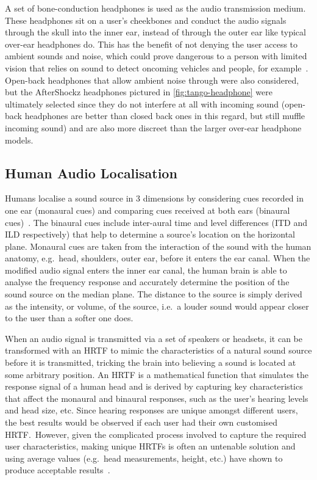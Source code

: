 \documentclass{llncs}
\begin{document}
A set of bone-conduction headphones is used as the audio transmission medium.
These headphones sit on a user's cheekbones and conduct the audio signals through the skull into the inner ear, instead of through the outer ear like typical over-ear headphones do. 
This has the benefit of not denying the user access to ambient sounds and noise, which could prove dangerous to a person with limited vision that relies on sound to detect oncoming vehicles and people, for example~\cite{lichtenstein2012headphone}.
Open-back headphones that allow ambient noise through were also considered, but the AfterShockz headphones pictured in \cref{fig:tango-headphone} were ultimately selected since they do not interfere at all with incoming sound (open-back headphones are better than closed back ones in this regard, but still muffle incoming sound) and are also more discreet than the larger over-ear headphone models. 

\subsection{Human Audio Localisation}

Humans localise a sound source in 3 dimensions by considering cues recorded in one ear (monaural cues) and comparing cues received at both ears (binaural cues)~\cite{blauert1997spatial,blauert1969sound}.
The binaural cues include inter-aural time and level differences (ITD and ILD respectively) that help to determine a source's location on the horizontal plane.
Monaural cues are taken from the interaction of the sound with the human anatomy, e.g.\ head, shoulders, outer ear, before it enters the ear canal.
When the modified audio signal enters the inner ear canal, the human brain is able to analyse the frequency response and accurately determine the position of the sound source on the median plane. 
The distance to the source is simply derived as the intensity, or volume, of the source, i.e.\ a louder sound would appear closer to the user than a softer one does. 

When an audio signal is transmitted via a set of speakers or headsets, it can be transformed with an HRTF to mimic the characteristics of a natural sound source before it is transmitted, tricking the brain into believing a sound is located at some arbitrary position.
An HRTF is a mathematical function that simulates the response signal of a human head and is derived by capturing key characteristics that affect the monaural and binaural responses, such as the user's hearing levels and head size, etc.
Since hearing responses are unique amongst different users, the best results would be observed if each user had their own customised HRTF.\
However, given the complicated process involved to capture the required user characteristics, making unique HRTFs is often an untenable solution and using average values (e.g.\ head measurements, height, etc.) have shown to produce acceptable results~\cite{gardner1995hrtf}.
\end{document}
